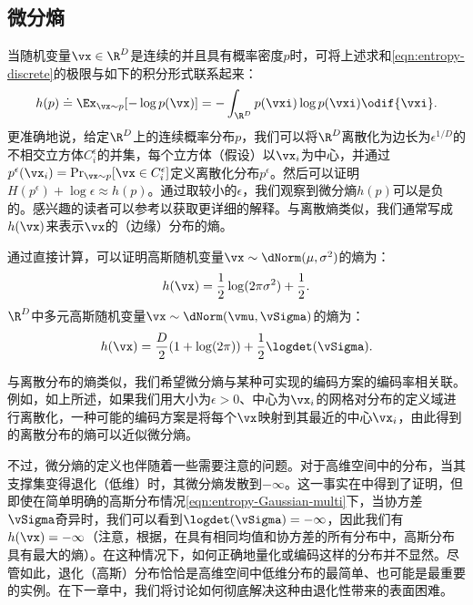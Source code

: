 \documentclass[../../book-main_zh.tex]{subfiles}
\begin{document}
\subsection{微分熵}

当随机变量\(\vx \in \R^{D}\)是连续的并且具有概率密度\(p\)时，可将上述求和\eqref{eqn:entropy-discrete}的极限与如下的积分形式联系起来：
\begin{equation}
    h(p) \doteq \Ex_{\vx \sim p}[-\log p(\vx)] = - \int_{\R^{D}}
    p(\vxi) \log p(\vxi) \odif{\vxi}.
    \label{eqn:entropy-differential}
\end{equation}
更准确地说，给定\(\R^{D}\)上的连续概率分布\(p\)，我们可以将\(\R^{D}\)离散化为边长为\(\epsilon^{1/D}\)的不相交立方体\(C_{i}^{\epsilon}\)的并集，每个立方体（假设）以\(\vx_{i}\)为中心，并通过\(p^{\epsilon}(\vx_{i}) = \Pr_{\vx \sim p}[\vx \in C_{i}^{\epsilon}]\)定义离散化分布\(p^{\epsilon}\)。然后可以证明\(H(p^{\epsilon}) + \log \epsilon \approx h(p)\)。通过取较小的\(\epsilon\)，我们观察到微分熵\(h(p)\)可以是负的。感兴趣的读者可以参考\cite{Cover-Thomas}以获取更详细的解释。与离散熵类似，我们通常写成\(h(\vx)\)来表示\(\vx\)的（边缘）分布的熵。

\begin{example}[高斯分布的熵]
    通过直接计算，可以证明高斯随机变量\(\vx \sim \dNorm(\mu, \sigma^{2})\)的熵为：
    \begin{equation}
        h(\vx) = \frac{1}{2}\log (2\pi
        \sigma^{2}) + \frac{1}{2}.
        \label{eqn:entropy-Gaussian}
    \end{equation}
    \(\R^{D}\)中多元高斯随机变量\(\vx \sim \dNorm(\vmu, \vSigma)\)的熵为：
    \begin{equation}
        h(\vx) = \frac{D}{2}(1 + \log(2\pi)) +
        \frac{1}{2}\logdet(\vSigma).
        \label{eqn:entropy-Gaussian-multi}
    \end{equation}
\end{example}

与离散分布的熵类似，我们希望微分熵与某种可实现的编码方案的编码率相关联。例如，如上所述，如果我们用大小为\(\epsilon > 0\)、中心为\(\vx_{i}\)的网格对分布的定义域进行离散化，一种可能的编码方案是将每个\(\vx\)映射到其最近的中心\(\vx_{i}\)，由此得到的离散分布的熵可以近似微分熵\cite{Cover-Thomas}。

不过，微分熵的定义也伴随着一些需要注意的问题。对于高维空间中的分布，当其支撑集变得退化（低维）时，其微分熵发散到\(-\infty\)。这一事实在中得到了证明，但即使在简单明确的高斯分布情况\eqref{eqn:entropy-Gaussian-multi}下，当协方差\(\vSigma\)奇异时，我们可以看到\(\logdet(\vSigma) = -\infty\)，因此我们有\(h(\vx) = -\infty\)（注意，根据，在具有相同均值和协方差的所有分布中，高斯分布具有最大的熵）。在这种情况下，如何正确地量化或编码这样的分布并不显然。尽管如此，退化（高斯）分布恰恰是高维空间中低维分布的最简单、也可能是最重要的实例。在下一章中，我们将讨论如何彻底解决这种由退化性带来的表面困难。
\end{document}
